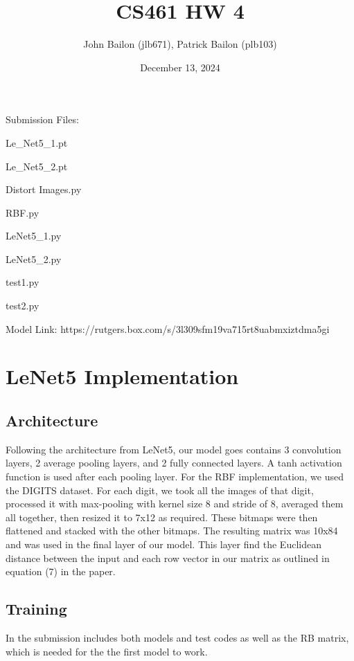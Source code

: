 \documentclass{article}
\title{CS461 HW 4}
\author{John Bailon (jlb671), Patrick Bailon (plb103)}
\date{December 13, 2024}
\begin{document}
\maketitle

\noindent
Submission Files:

Le\_Net5\_1.pt

Le\_Net5\_2.pt

Distort Images.py

RBF.py

LeNet5\_1.py    

LeNet5\_2.py

test1.py 

test2.py 

Model Link: https://rutgers.box.com/s/3l309sfm19va715rt8uabmxiztdma5gi

\section{LeNet5 Implementation}
\subsection{Architecture}
Following the architecture from LeNet5, our model goes contains 3 convolution layers, 2 average pooling layers, and 2 fully connected layers. A tanh activation function is used after each pooling layer. For the RBF implementation, we used the DIGITS dataset. For each digit, we took all the images of that digit, processed it with max-pooling with kernel size 8 and stride of 8, averaged them all together, then resized it to 7x12 as required. These bitmaps were then flattened and stacked with the other bitmaps. The resulting matrix was 10x84 and was used in the final layer of our model. This layer find the Euclidean distance between the input and each row vector in our matrix as outlined in equation (7) in the paper.

\subsection{Training}
In the submission includes both models and test codes as well as the RB matrix, which is needed for the the first model to work.
\end{document}
